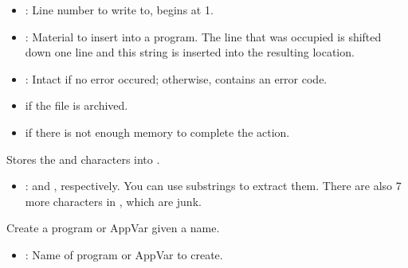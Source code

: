 \documentclass[letterpaper,10pt,english]{sphinxmanual}
\begin{document}
\begin{description}
\begin{description}
\begin{itemize}
\item {} 
\sphinxAtStartPar
{}: Line number to write to, begins at 1.

\item {} 
\sphinxAtStartPar
{}: Material to insert into a program. The line that was occupied is shifted down one line and this string is inserted into the resulting location.

\end{itemize}

\begin{itemize}
\item {} 
\sphinxAtStartPar
{}: Intact if no error occured; otherwise, contains an error code.

\end{itemize}

\begin{itemize}
\item {} 
\sphinxAtStartPar
{} if the file is archived.

\item {} 
\sphinxAtStartPar
{} if there is not enough memory to complete the action.

\end{itemize}

\end{description}

\sphinxAtStartPar
Stores the \sphinxcode{\sphinxupquote{\sphinxhyphen{}\textgreater{}}} and  characters into .
\begin{description}
\begin{itemize}
\item {} 
\sphinxAtStartPar
{}: \sphinxcode{\sphinxupquote{\sphinxhyphen{}\textgreater{}}} and , respectively. You can use substrings to extract them. There are also 7 more characters in , which are junk.

\end{itemize}

\end{description}

\sphinxAtStartPar
Create a program or AppVar given a name.
\begin{description}
\begin{itemize}
\item {} 
\sphinxAtStartPar
{}: Name of program or AppVar to create.


\end{itemize}
\end{description}
\end{description}
\end{document}

